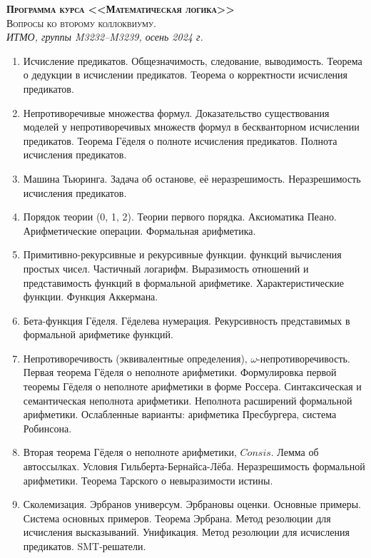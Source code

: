 \documentclass[11pt,a4paper,oneside]{scrartcl}
\begin{document}
\pagestyle{empty}

\begin{center}
{\large\scshape\bfseries Программа курса <<Математическая логика>>}\\
{\large\scshape Вопросы ко второму коллоквиуму.}\\
\itshape ИТМО, группы M3232--M3239, осень 2024 г.
\end{center}


\begin{enumerate}
\item Исчисление предикатов. Общезначимость, следование, выводимость. Теорема о дедукции в исчислении предикатов.
Теорема о корректности исчисления предикатов.
\item Непротиворечивые множества формул. Доказательство существования моделей у непротиворечивых множеств формул 
в бескванторном исчислении предикатов.
Теорема Гёделя о полноте исчисления предикатов. Полнота исчисления предикатов.
\item Машина Тьюринга. Задача об останове, её неразрешимость. Неразрешимость исчисления предикатов.
\item Порядок теории (0, 1, 2). Теории первого порядка. Аксиоматика Пеано. Арифметические операции. Формальная арифметика. 
\item Примитивно-рекурсивные и рекурсивные функции. 
функций вычисления простых чисел. Частичный логарифм.
Выразимость отношений и представимость функций в формальной арифметике. Характеристические функции.
Функция Аккермана. 
\item Бета-функция Гёделя. 
Гёделева нумерация. Рекурсивность представимых в формальной арифметике функций.
\item Непротиворечивость (эквивалентные определения), $\omega$-не\-про\-ти\-во\-ре\-чи\-вость. 
Первая теорема Гёделя о неполноте арифметики.
Формулировка первой теоремы Гёделя о неполноте арифметики в форме Россера. 
Синтаксическая и семантическая неполнота арифметики.
Неполнота расширений формальной арифметики.
Ослабленные варианты: арифметика Пресбургера, система Робинсона.
\item Вторая теорема Гёделя о неполноте арифметики, $Consis$. 
Лемма об автоссылках. Условия Гильберта-Бернайса-Лёба. Неразрешимость формальной арифметики. Теорема Тарского о невыразимости истины.
\item Сколемизация. Эрбранов универсум. Эрбрановы оценки. Основные примеры. Система основных примеров. Теорема Эрбрана.
Метод резолюции для исчисления высказываний. Унификация. Метод резолюции для исчисления предикатов. SMT-решатели.
\end{enumerate}
\end{document}
